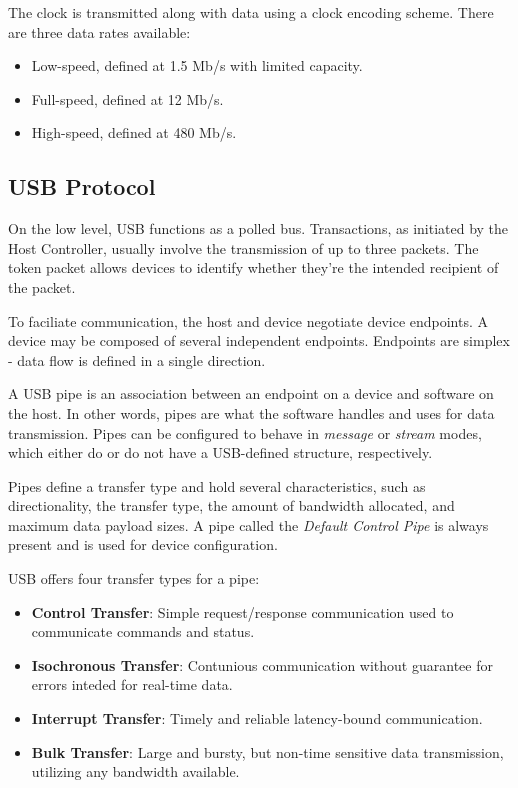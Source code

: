             The clock is transmitted along with data using a clock encoding scheme.  There are three data rates available:
            \begin{itemize}
                \item Low-speed, defined at 1.5 Mb/s with limited capacity.
                \item Full-speed, defined at 12 Mb/s.
                \item High-speed, defined at 480 Mb/s.
            \end{itemize}
        
        \subsection{USB Protocol}
            On the low level, USB functions as a polled bus.  Transactions, as initiated by the Host Controller, usually involve the transmission of up to three packets.  The token packet allows devices to identify whether they're the intended recipient of the packet.
            
            To faciliate communication, the host and device negotiate device endpoints.  A device may be composed of several independent endpoints.  Endpoints are simplex - data flow is defined in a single direction.
            
            A USB pipe is an association between an endpoint on a device and software on the host.  In other words, pipes are what the software handles and uses for data transmission.  Pipes can be configured to behave in \emph{message} or \emph{stream} modes, which either do or do not have a USB-defined structure, respectively.
            
            Pipes define a transfer type and hold several characteristics, such as directionality, the transfer type, the amount of bandwidth allocated, and maximum data payload sizes.  A pipe called the \emph{Default Control Pipe} is always present and is used for device configuration.
            
            
            USB offers four transfer types for a pipe:
            \begin{itemize}
                \item \textbf{Control Transfer}: Simple request/response communication used to communicate commands and status.
                \item \textbf{Isochronous Transfer}: Contunious communication without guarantee for errors inteded for real-time data.
                \item \textbf{Interrupt Transfer}: Timely and reliable latency-bound communication.
                \item \textbf{Bulk Transfer}: Large and bursty, but non-time sensitive data transmission, utilizing any bandwidth available.
            \end{itemize}
            
